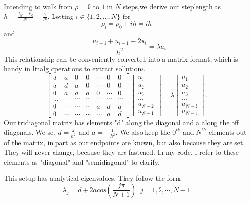 \documentclass[10pt, twocolumn]{article}
\begin{document}
Intending to walk from $\rho = 0$ to $1$ in $N$ steps,we derive our steplength as 
$h = \frac{\rho_N - \rho_0}{N} = \frac{1}{N}$. Letting $i \in \{ 1, 2, \ldots, N\}$ for 
\[\rho_i = \rho_0 + ih = ih\] and
\[ -\frac{u_{i+1} + u_{i-1} - 2u_{i}}{h^2} = \lambda u_i\]
This relationship can be conveniently converted into a matrix format, which is handy in linalg 
operations to extract sollutions. 
\begin{equation}
    \begin{bmatrix} d& a & 0   & 0    & \cdots  &0     & 0 \\
                                a & d & a & 0    & \cdots  &0     &0 \\
                                0   & a & d & a  &0       &\cdots & 0\\
                                \dots  & \cdots & \cdots & \cdots  &\cdots      &\cdots & \cdots\\
                                0   & \cdots & \cdots & \cdots  &a  &d & a\\
                                0   & \cdots & \cdots & \cdots  &\cdots       &a & d\end{bmatrix} 
                                 \begin{bmatrix} u_1 \\ u_2 \\ u_3 \\ \dots \\ u_{N-2} \\ u_{N-1}\end{bmatrix} 
                                     = \lambda \begin{bmatrix} u_1 \\ u_2 \\ u_3 \\ \dots \\ u_{N-2} \\ u_{N-1}\end{bmatrix} . 
\label{eq:matrixse} 
\end{equation}
Our tridiagonal matrix has elements "d" along the diagonal and a along the 
off diagonals. We set $d = \frac{2}{h^2}$ and $a = -\frac{1}{h^2}$. We also keep the $0^{th}$ 
and $N^{th}$ elements out of the matrix, in part as our endpoints are known, but also because 
they are set. They will never change, because they are fastened. In my code, I refer to these 
elements as "diagonal" and "semidiagonal" to clarify. 

This setup has analytical eigenvalues. They follow the form
\[ \lambda_j = d + 2acos(\frac{j\pi}{N+1}) \;\; j = 1, 2, \cdots, N-1 \]\\
\end{document}

